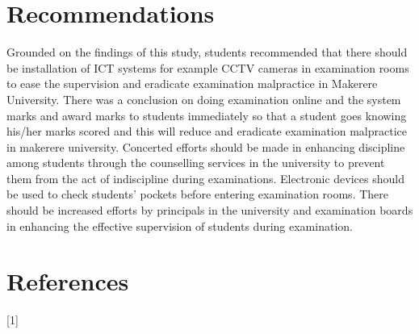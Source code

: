 \documentclass [8 pt]{article}
\begin{document}
\section {Recommendations}
Grounded on the findings of this study, students recommended that there should be installation of ICT systems for example CCTV cameras in examination rooms to ease the supervision and eradicate examination malpractice in Makerere University. There was a conclusion on doing examination online and the system marks and award marks to students immediately so that a student goes knowing his/her marks scored and this will reduce and eradicate examination malpractice in makerere university.
Concerted efforts should be made in enhancing discipline among students through the counselling services in the university to prevent them from the act of indiscipline during examinations. Electronic devices should be used to check students’ pockets before entering examination rooms.
There should be increased efforts by principals in the university and examination boards in enhancing the effective supervision of students during examination.
\section {References}

[1]
\end{document}
